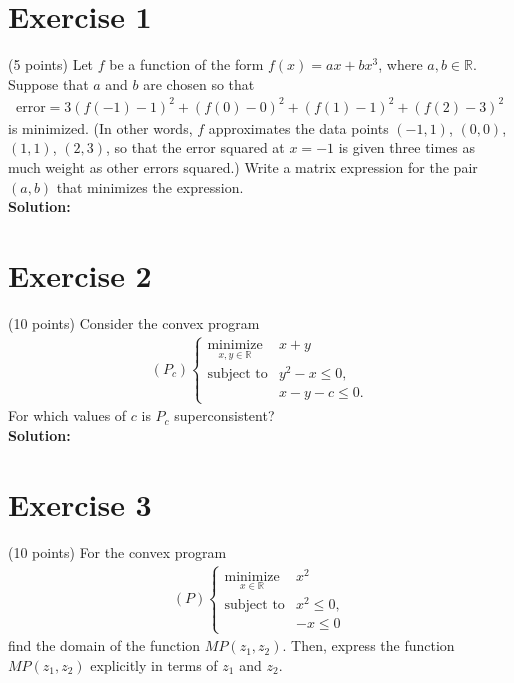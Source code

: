 \documentclass{article}
\begin{document}
\section*{Exercise 1}
(5 points) Let $f$ be a function of the form $f(x) = ax + bx^3$, where $a, b \in \mathbb{R}$. Suppose that $a$ and $b$ are chosen so that
\begin{align*}
\text{error} = 3(f(-1) - 1)^2 + (f(0) - 0)^2 + (f(1) - 1)^2 + (f(2) - 3)^2
\end{align*}
is minimized. (In other words, $f$ approximates the data points $(-1,1)$, $(0,0)$, $(1,1)$, $(2,3)$, so that the error squared at $x = -1$ is given three times as much weight as other errors squared.) Write a matrix expression for the pair $(a, b)$ that minimizes the  expression. \\

\textbf{Solution:} \\



\newpage

\section*{Exercise 2}
(10 points) Consider the convex program
\begin{align*}
(P_c) \begin{cases}
\underset{x,y\in\mathbb{R}}{\text{minimize}} & x + y \\
\text{subject to} & y^2 - x \leq 0, \\
& x - y - c \leq 0.
\end{cases}
\end{align*}
For which values of $c$ is $P_c$ superconsistent? \\

\textbf{Solution:} \\



\newpage

\section*{Exercise 3}
(10 points) For the convex program
\begin{align*}
(P) \begin{cases}
\underset{x\in\mathbb{R}}{\text{minimize}} & x^2 \\
\text{subject to} & x^2 \leq 0, \\
& -x \leq 0
\end{cases}
\end{align*}
find the domain of the function $MP(z_1, z_2)$. Then, express the function $MP(z_1, z_2)$ explicitly in terms of $z_1$ and $z_2$. \\
\end{document}
